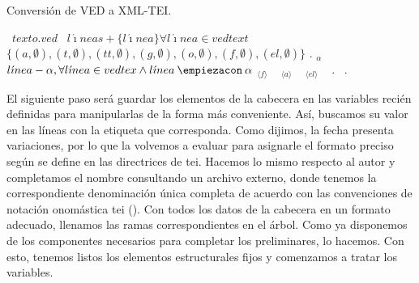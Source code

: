 \begin{algorithm}[!ht] %
	\caption{Conversión de VED a XML-TEI.}\label{list:txt2tei}
	\vedtext \gets\ $texto.ved$\;
	\lineas \gets\ $l\acute{\imath}neas + \{l\acute{\imath}nea\} \forall l\acute{\imath}nea \in vedtext$\;
	\variables \gets\ $\{(a,\emptyset), (t, \emptyset), (tt, \emptyset), (g, \emptyset), (o, \emptyset), (f, \emptyset), (el, \emptyset)\}$\;
	\arbol \gets \CreaXML{}\;
	\arbol. \;
	\variable$_{\alpha}$ \gets\ $l\acute{\imath}nea - \alpha, \forall l\acute{\imath}nea \in vedtex \wedge l\acute{\imath}nea\: \text{\empiezacon}\: \alpha$ \;
	\variables$_{\langle f\rangle}$ \gets\  \;
	\variables$_{\langle a\rangle}$ \gets\  \;
	\variables$_{\langle el\rangle}$ \gets\  \;
	\arbol.\cabecera \gets\ \;
	\arbol.\preliminares \gets\  \;
\end{algorithm}

El siguiente paso será guardar los elementos de la cabecera en las variables recién definidas para manipularlas de la forma más conveniente. Así, buscamos su valor en las líneas con la etiqueta que corresponda. Como dijimos, la fecha presenta variaciones, por lo que la volvemos a evaluar para asignarle el formato preciso según se define en las directrices de \ac{tei}. Hacemos lo mismo respecto al autor y completamos el nombre consultando un archivo externo, donde tenemos la correspondiente denominación única completa de acuerdo con las convenciones de notación onomástica \ac{tei} (). Con todos los datos de la cabecera en un formato adecuado, llenamos las ramas correspondientes en el árbol. Como ya disponemos de los componentes necesarios para completar los preliminares, lo hacemos. Con esto, tenemos listos los elementos estructurales fijos y comenzamos a tratar los variables.

